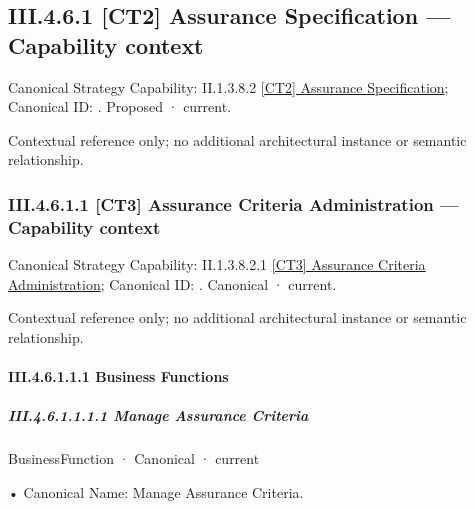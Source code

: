 \subsection*{III.4.6.1 [CT2] Assurance Specification — Capability context}
\label{navigation:III.4.6.1}

{\small Canonical Strategy Capability: II.1.3.8.2 \hyperref[element:b81775d89d774cf8ba61731d13c67a54]{[CT2] Assurance Specification}; Canonical ID: \texttt{}. Proposed · current.}\par
Contextual reference only; no additional architectural instance or semantic relationship.\par
\subsubsection*{III.4.6.1.1 [CT3] Assurance Criteria Administration — Capability context}
\label{navigation:III.4.6.1.1}

{\small Canonical Strategy Capability: II.1.3.8.2.1 \hyperref[element:1bfd71f24321428c8871b587d413f47e]{[CT3] Assurance Criteria Administration}; Canonical ID: \texttt{}. Canonical · current.}\par
Contextual reference only; no additional architectural instance or semantic relationship.\par
\paragraph*{III.4.6.1.1.1 Business Functions}
\label{navigation:III.4.6.1.1.1}

\subparagraph*{III.4.6.1.1.1.1 Manage Assurance Criteria}
\label{navigation:III.4.6.1.1.1.1}

\label{element:d7e9ba5addd94db2bce164c7c9809e4e}
{\small BusinessFunction · Canonical · current}\par

•
Canonical Name: Manage Assurance Criteria.



